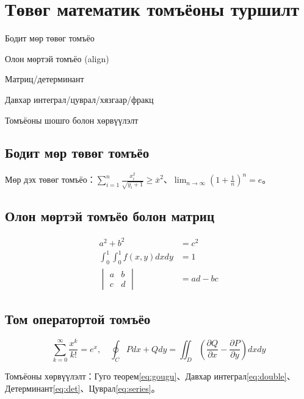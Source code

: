 \documentclass[mn]{../../elegantbook}
\begin{document}
\chapter{Төвөг математик томъёоны туршилт}
\begin{introduction}
\item Бодит мөр төвөг томъёо
\item Олон мөртэй томъёо (align)
\item Матриц/детерминант
\item Давхар интеграл/цуврал/хязгаар/фракц
\item Томъёоны шошго болон хөрвүүлэлт
\end{introduction}

\section{Бодит мөр төвөг томъёо}
Мөр дэх төвөг томъёо：$\sum_{i=1}^n \frac{x_i^2}{\sqrt{y_i+1}} \geq \bar{x}^2$、$\lim_{n\to\infty} \left(1+\frac{1}{n}\right)^n = e$。

\section{Олон мөртэй томъёо болон матриц}
\begin{align}
a^2 + b^2 &= c^2 \label{eq:gougu} \\
\int_{0}^{1}\int_{0}^{1} f(x,y) dxdy &= 1 \label{eq:double} \\
\begin{vmatrix}
a & b \\
c & d
\end{vmatrix} &= ad-bc \label{eq:det}
\end{align}

\section{Том оператортой томъёо}
\begin{equation}\label{eq:series}
\sum_{k=0}^{\infty} \frac{x^k}{k!} = e^x,\quad \oint_{C} Pdx+Qdy = \iint_{D}\left(\frac{\partial Q}{\partial x}-\frac{\partial P}{\partial y}\right)dxdy
\end{equation}

Томъёоны хөрвүүлэлт：Гуго теорем\eqref{eq:gougu}、Давхар интеграл\eqref{eq:double}、Детерминант\eqref{eq:det}、Цуврал\eqref{eq:series}。

\end{document}
